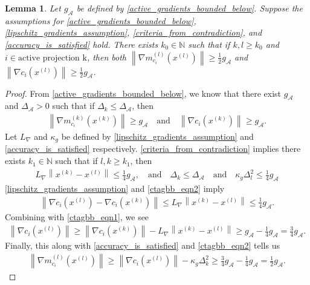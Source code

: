 \documentclass{article}
\newtheorem{lemma}[theorem]{Lemma}
\theoremstyle{case}
\numberwithin{theorem}{subsection}
\newcommand{\dk}{\Delta_k}
\newcommand{\dl}{\Delta_l}
\newcommand{\gmcik}{{\nabla m_{c_i}^{(k)}\left(\xk\right)}}
\newcommand{\gmcil}{{\nabla m_{c_i}^{(l)}\left(\xl\right)}}
\newcommand{\lipgrad}{{L_{\nabla}}}
\newcommand{\minactivegraddelta}{{\Delta_{\mathcal A}}}
\newcommand{\minactivegrad}{{ g_{\mathcal A} }}
\newcommand{\naturals}{\mathbb N}
\newcommand{\xk}{x^{(k)}}
\newcommand{\xl}{{x^{(l)}}}
\newcommand{\activeprojk}{{\textrm{active projection k}}}
\begin{document}
\begin{lemma}
\label{close_to_active_gradients_bounded_below}
Let $\minactivegrad$ be defined by \cref{active_gradients_bounded_below}.
Suppose the assumptions for 
\cref{active_gradients_bounded_below}, 
\cref{lipschitz_gradients_assumption}, 
\cref{criteria_from_contradiction},
and \cref{accuracy_is_satisfied} hold.
There exists $k_0 \in \naturals$ such that if $k, l \ge k_0$ and $i \in \activeprojk$,
then both
$\left\|\gmcil\right\| \ge \frac 1 2 \minactivegrad$
and
$\left\|\nabla c_i\left(\xl\right)\right\| \ge \frac 1 2  \minactivegrad$.
\end{lemma}
\begin{proof}
From \cref{active_gradients_bounded_below}, we know that there exist $\minactivegrad$ and $\minactivegraddelta > 0$ such that
if $\dk \le \minactivegraddelta$, then
\begin{align}
\label{ctagbb_eqn1}
\left\|\gmcik\right\| \ge \minactivegrad \quad \textrm{and} \quad
\left\|\nabla c_i\left(\xk\right)\right\| \ge \minactivegrad.
\end{align}
Let $\lipgrad$ and $\kappa_g$ be defined by \cref{lipschitz_gradients_assumption} and \cref{accuracy_is_satisfied} respectively.
\cref{criteria_from_contradiction} implies there exists $k_1 \in \naturals$ such that if $l, k \ge k_1$, then
\begin{align}
\label{ctagbb_eqn2}
\lipgrad \left\|\xk - \xl\right\| \le \frac 1 4 \minactivegrad,
\quad \textrm{and} \quad
\dk \le \minactivegraddelta
\quad \textrm{and} \quad
\kappa_g \dl^2 \le \frac 1 4 \minactivegrad
\end{align}
\cref{lipschitz_gradients_assumption} and \cref{ctagbb_eqn2} imply
\begin{align*}
\left\|\nabla c_i\left(\xl\right) - \nabla c_i\left(\xk\right)\right\| \le \lipgrad \left\|\xk - \xl\right\| \le \frac 1 4 \minactivegrad.
\end{align*}
Combining with \cref{ctagbb_eqn1}, we see
\begin{align*}
\left\|\nabla c_i\left(\xl\right)\right\| \ge \left\|\nabla c_i\left(\xk\right)\right\| - \lipgrad \left\|\xk - \xl\right\|
\ge \minactivegrad - \frac 1 4 \minactivegrad = \frac 3 4 \minactivegrad.
\end{align*}
Finally, this along with \cref{accuracy_is_satisfied} and \cref{ctagbb_eqn2} tells us
\begin{align*}
\left\|\gmcil\right\| \ge \left\|\nabla c_i\left(\xl\right)\right\| - \kappa_g \dk^2 \ge \frac 3 4 \minactivegrad - \frac 1 4 \minactivegrad = \frac 1 2 \minactivegrad.
\end{align*}
\end{proof}
\end{document}
